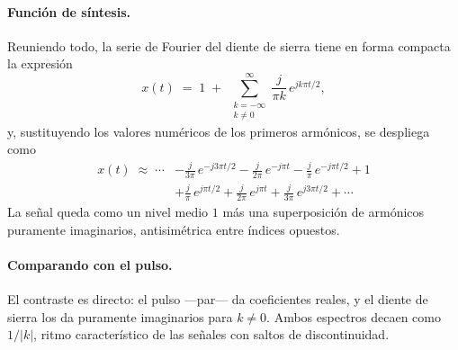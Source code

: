 \documentclass[class=book, crop=false]{standalone}
\begin{document}
\paragraph{Función de síntesis.}
Reuniendo todo, la serie de Fourier del diente de sierra tiene
en forma compacta la expresión
\begin{equation*}
    x(t) \;=\; 1 \;+\;
        \sum_{\substack{k=-\infty \\ k\neq 0}}^{\infty}
        \frac{j}{\pi k}\,e^{j k \pi t/2},
\end{equation*}
y, sustituyendo los valores numéricos de los primeros
armónicos, se despliega como
\begin{align*}
    x(t) \;\approx\; \cdots
        & - \tfrac{j}{3\pi}\,e^{-j 3\pi t/2}
        - \tfrac{j}{2\pi}\,e^{-j\pi t}
        - \tfrac{j}{\pi}\,e^{-j\pi t/2}
        + 1 \\
        & + \tfrac{j}{\pi}\,e^{j\pi t/2}
        + \tfrac{j}{2\pi}\,e^{j\pi t}
        + \tfrac{j}{3\pi}\,e^{j 3\pi t/2}
        + \cdots
\end{align*}
La señal queda como un nivel medio $1$ más una superposición
de armónicos puramente imaginarios, antisimétrica entre
índices opuestos.

\paragraph{Comparando con el pulso.}
El contraste es directo: el pulso ---par--- da coeficientes
reales, y el diente de sierra los da puramente imaginarios
para $k\neq 0$. Ambos espectros decaen como $1/|k|$, ritmo
característico de las señales con saltos de discontinuidad.
\end{document}
